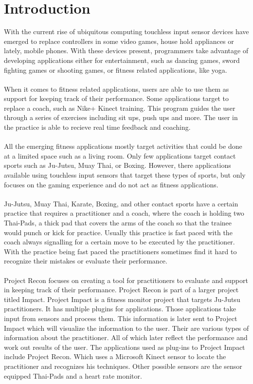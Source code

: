 \chapter{Introduction}
\label{chap:intro}
With the current rise of ubiquitous computing touchless input sensor devices have emerged to replace controllers in some video games, house hold appliances or lately, mobile phones. With these devices present, programmers take advantage of developing applications either for entertainment, such as dancing games, sword fighting games or shooting games, or fitness related applications, like yoga.  
\\
\\
When it comes to fitness related applications, users are able to use them as support for keeping track of their performance. Some applications target to replace a coach, such as Nike+ Kinect training. This program guides the user through a series of exercises including sit ups, push ups and more. The user in the practice is able to recieve real time feedback and coaching.
\\
\\
All the emerging fitness applications mostly target activities that could be done at a limited space such as a living room. Only few applications target contact sports such as Ju-Jutsu, Muay Thai, or Boxing. However, there applications available using touchless input sensors that target these types of sports, but only focuses on the gaming experience and do not act as fitness applications.
\\
\\
Ju-Jutsu, Muay Thai, Karate, Boxing, and other contact sports have a certain practice that requires a practitioner and a coach, where the coach is holding two Thai-Pads, a thick pad that covers the arms of the coach so that the trainee would punch or kick for practice. Usually this practice is fast paced with the coach always signalling for a certain move to be executed by the practitioner. With the practice being fast paced the practitioners sometimes find it hard to recognize their mistakes or evaluate their performance.
\\
\\  
Project Recon focuses on creating a tool for practitioners to evaluate and support in keeping track of their performance. Project Recon is part of a larger project titled Impact. Project Impact is a fitness monitor project that targets Ju-Jutsu practitioners. It has multiple plugins for applications. Those applications take input from sensors and process them. This information is later sent to Project Impact which will visualize the information to the user. Their are various types of information about the practitioner. All of which later reflect the performance and work out results of the user. The applications used as plug-ins to Project Impact include Project Recon. Which uses a Microsoft Kinect sensor to locate the practitioner and recognizes his techniques. Other possible sensors are the sensor equipped Thai-Pads and a heart rate monitor.

